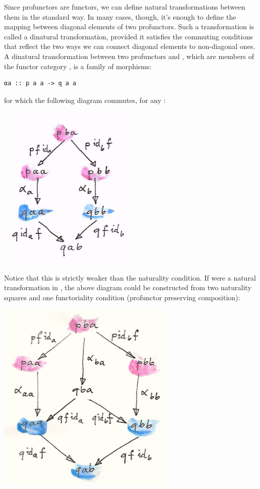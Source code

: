 Since profunctors are functors, we can define natural transformations
between them in the standard way. In many cases, though, it's enough to
define the mapping between diagonal elements of two profunctors. Such a
transformation is called a dinatural transformation, provided it
satisfies the commuting conditions that reflect the two ways we can
connect diagonal elements to non-diagonal ones. A dinatural
transformation between two profunctors  and , which
are members of the functor category , is a
family of morphisms:

\begin{verbatim}
αa :: p a a -> q a a
\end{verbatim}

for which the following diagram commutes, for any
:

\includegraphics[width=2.77083in]{images/end.jpg}

Notice that this is strictly weaker than the naturality condition. If
 were a natural transformation in
, the above diagram could be constructed
from two naturality squares and one functoriality condition (profunctor
 preserving composition):

\includegraphics[width=3.36458in]{images/end-1.jpg}

